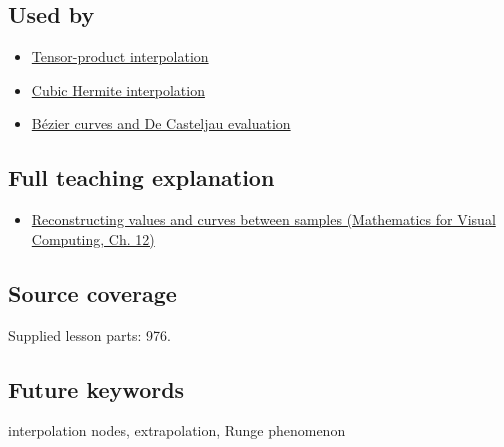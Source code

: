 \subsection{Used by}\label{appendix-0c2a5f69851e-used-by}

\begin{itemize}
\tightlist
\item
  \hyperref[appendix-0a09b6dfdc86]{Tensor-product interpolation}
\item
  \hyperref[appendix-db3aef8f2fd6]{Cubic Hermite interpolation}
\item
  \hyperref[appendix-ddbec701898c]{Bézier curves and De Casteljau evaluation}
\end{itemize}

\subsection{Full teaching explanation}\label{appendix-0c2a5f69851e-full-teaching-explanation}

\begin{itemize}
\tightlist
\item
  \href{../02-Mathematics-for-Visual-Computing/main.pdf\#nameddest=02-foundations-ii-ch028-reconstructing-values-and-curves-between-samples}{Reconstructing values and curves between samples (Mathematics for Visual Computing, Ch. 12)}
\end{itemize}

\subsection{Source coverage}\label{appendix-0c2a5f69851e-source-coverage}

Supplied lesson parts: 976.

\subsection{Future keywords}\label{appendix-0c2a5f69851e-future-keywords}

interpolation nodes, extrapolation, Runge phenomenon
